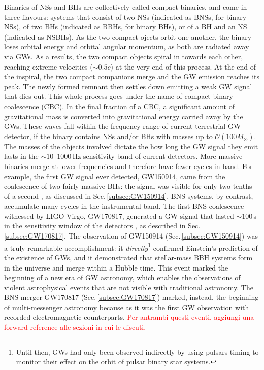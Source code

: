 \documentclass[binding=0.6cm, LaM]{sapthesis}
\newcommand{\fpg}[1]{\textcolor{red}{#1} }
\begin{document}
        Binaries of NSs and BHs are collectively called compact binaries,
        and come in three flavours: systems that consist of two NSs (indicated as BNSs, for binary NSs), 
	of two BHs (indicated as BBHs, for binary BHs), or of a BH and an NS (indicated as NSBHs).
        As the two compact ojects orbit one another, the binary loses orbital energy and orbital angular momentum, 
	as both are radiated away via GWs.
        As a results, the two compact objects spiral in towards each other, 
	reaching extreme velocities ($\sim 0.5c$) at the very end of this process. 
        At the end of the inspiral, the two compact companions merge and 
	the GW emission reaches its peak. 
	The newly formed remnant then settles down emitting a weak GW signal that dies out.  
	This whole process goes under the name of compact binary coalescence (CBC).
	In the final fraction of a CBC, a significant amount of gravitational mass is converted 
	into gravitational energy carried away by the GWs.  
	These waves fall within the frequency range of current terrestrial GW detector, 
	if the binary contains NSs and/or BHs with masses up to $\mathcal{O}(100M_\odot)$.
        The masses of the objects involved dictate the how long the GW signal they emit 
	lasts in the $\sim 10$--$1000$\,Hz sensitivity band of current detectors.
        More massive binaries merge at lower frequencies and therefore have fewer cycles in band.
        For example, the first GW signal ever detected, GW150914, came from the coalescence of two fairly massive BHs: 
	the signal was visible for only two-tenths of a second \cite{14}, as discussed in Sec.\,\ref{subsec:GW150914}. 
        BNS systems, by contrast, accumulate many cycles in the instrumental band.
        The first BNS coalescence witnessed by LIGO-Virgo, GW170817, 
	generated a GW signal that lasted $\sim 100\,$s in the sensitivity window of the detectors \cite{15}, 
	as described in Sec.\,\ref{subsec:GW170817}.
	The observation of GW150914 (Sec.\,\ref{subsec:GW150914}) was a truly remarkable accomplishment: 
	it \emph{directly}\footnote{Until then, GWs had only been observed indirectly by using pulsars timing to monitor 
        their effect on the orbit of pulsar binary star systems.} confirmed Einstein's prediction of the existence of GWs, 
	and it demonstrated that stellar-mass BBH systems form in the universe and merge within a Hubble time.
	This event marked the beginning of a new era of GW astronomy, 
	which enables the observations of violent astrophysical events that are not visible with traditional astronomy.
	The BNS merger GW170817 (Sec.\,\ref{subsec:GW170817}) marked, instead, the beginning of multi-messenger astronomy 
	because as it was the first GW observation with recorded electromagnetic counterparts.  	
	\fpg{Per antrambi questi eventi, aggiungi una forward reference alle sezioni in cui le discuti.}
\end{document}
